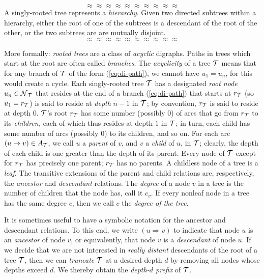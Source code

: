 \[ \approx \approx \approx \approx \approx \approx \approx \approx \approx \approx \]
A singly-rooted tree represents a {\it hierarchy}.
  Given two
directed subtrees within a hierarchy, either the root of one of the
subtrees is a descendant of the root of the other, or the two subtrees
are are mutually disjoint.
\[ \approx \approx \approx \approx \approx \approx \approx \approx \approx \approx \]

More formally: {\em rooted trees} are a class of {\em acyclic}
digraphs.  Paths in trees which start at the root are often called
{\em branches}.  The {\em acyclicity} of a tree $\mbox{$\cal T$}$ means that for
any branch of $\mbox{$\cal T$}$ of the form (\ref{eq:di-path}), we cannot have $u_1 =
u_n$, for this would create a cycle.  Each singly-rooted tree $\mbox{$\cal T$}$ has
a designated {\em root node}  $u_n \in
\mbox{$\cal N$}_{\mbox{{\scriptsize $\cal T$}}}$ that resides at the end of a branch (\ref{eq:di-path}) that
starts at $r_{\mbox{{\scriptsize $\cal T$}}}$ (so $u_1 = r_{\mbox{{\scriptsize $\cal T$}}}$) is said to reside at {\em
  depth} $n-1$ in $\mbox{$\cal T$}$; by convention, $r_{\mbox{{\scriptsize $\cal T$}}}$ is said to reside at
depth $0$.   $\mbox{$\cal T$}$'s
root $r_{\mbox{{\scriptsize $\cal T$}}}$ has some number (possibly $0$) of arcs that go from
$r_{\mbox{{\scriptsize $\cal T$}}}$ to its {\em children,} each of which thus resides at depth
$1$ in $\mbox{$\cal T$}$; in turn, each child has some number of arcs (possibly
$0$) to its children, and so on.  For each arc $(u \rightarrow v) \in
A_{\mbox{{\scriptsize $\cal T$}}}$, we call $u$ a {\it parent}  of $v$,
and $v$ a {\it child}  of $u$, in $\mbox{$\cal T$}$;
clearly, the depth of each child is one greater than the depth of its
parent.  Every node of $\mbox{$\cal T$}$ except for $r_{\mbox{{\scriptsize $\cal T$}}}$ has precisely one
parent; $r_{\mbox{{\scriptsize $\cal T$}}}$ has no parents.  A childless node of a tree is a
{\em leaf}.   The transitive extensions of the
parent and child relations are, respectively, the {\em ancestor}
 and {\em descendant}
 relations.  The {\em degree}
 of a node $v$ in a tree is the
number of children that the node has, call it $c_v$.  If every nonleaf
node in a tree has the same degree $c$, then we call $c$ the {\em
  degree of the tree}.

It is sometimes useful to have a symbolic notation for the ancestor
and descendant relations.  To this end, we write $(u \Rightarrow v)$
 to
indicate that node $u$ is an {\it ancestor} of node $v$, or
equivalently, that node $v$ is a {\it descendant} of node $u$.  If we
decide that we are not interested in {\em really distant} descendants
of the root of a tree $\mbox{$\cal T$}$, then we can {\em truncate} 
$\mbox{$\cal T$}$ at a desired depth $d$ by removing all nodes whose depths exceed
$d$.  We thereby obtain the {\em depth-$d$ prefix} of $\mbox{$\cal T$}$.

